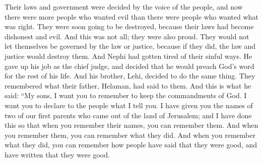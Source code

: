 \bverse \iffalse For as their laws and their governments were established by the voice of the people, and they who chose evil were more numerous than they who chose good, therefore they were ripening for destruction, for the laws had become corrupted. \fi
Their laws and government were decided by the voice of the people, and now there were more people who wanted evil than there were people who wanted what was right. They were soon going to be destroyed, because their laws had become dishonest and evil.
\bverse \iffalse Yea, and this was not all; they were a stiffnecked people, insomuch that they could not be governed by the law nor justice, save it were to their destruction. \fi
And this was not all; they were also proud. They would not let themselves be governed by the law or justice, because if they did, the law and justice would destroy them.
\bverse \iffalse And it came to pass that Nephi had become weary because of their iniquity; and he yielded up the judgment-seat, and took it upon him to preach the word of God all the remainder of his days, and his brother Lehi also, all the remainder of his days; \fi
And Nephi had gotten tired of their sinful ways. He gave up his job as the chief judge, and decided that he would preach God's word for the rest of his life. And his brother, Lehi, decided to do the same thing.
\bverse \iffalse For they remembered the words which their father Helaman spake unto them. And these are the words which he spake: \fi
They remembered what their father, Helaman, had said to them. And this is what he said:
\bverse \iffalse Behold, my sons, I desire that ye should remember to keep the commandments of God; and I would that ye should declare unto the people these words. Behold, I have given unto you the names of our first parents who came out of the land of Jerusalem; and this I have done that when you remember your names ye may remember them; and when ye remember them ye may remember their works; and when ye remember their works ye may know how that it is said, and also written, that they were good. \fi
``My sons, I want you to remember to keep the commandments of God. I want you to declare to the people what I tell you. I have given you the names of two of our first parents who came out of the land of Jerusalem; and I have done this so that when you remember their names, you can remember them. And when you remember them, you can remember what they did. And when you remember what they did, you can remember how people have said that they were good, and have written that they were good.
